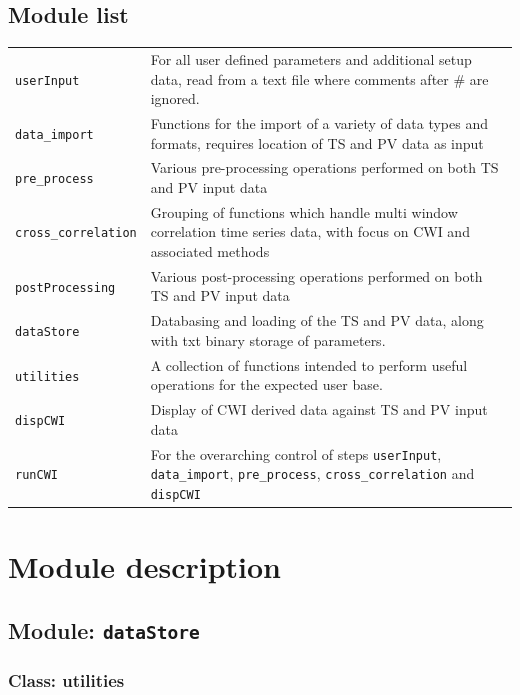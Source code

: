 \documentclass{article}
\begin{document}
\subsection{Module list}
\begin{tabular}{l|p{120mm}}
\texttt{userInput} & For all user defined parameters and additional setup data, read from a text file where comments after \# are ignored.  \\
\texttt{data\_import} & Functions for the import of a variety of data types and formats, requires location of TS and PV data as input  \\
\texttt{pre\_process} & Various pre-processing operations performed on both TS and PV input data \\
\texttt{cross\_correlation} & Grouping of functions which handle multi window correlation time series data, with focus on CWI and associated methods  \\
\texttt{postProcessing} & Various post-processing operations performed on both TS and PV input data \\
\texttt{dataStore} & Databasing and loading of the TS and PV data, along with txt binary storage of parameters.  \\
\texttt{utilities} & A collection of functions intended to perform useful operations for the expected user base.  \\
\texttt{dispCWI} & Display of CWI derived data against TS and PV input data  \\
\texttt{runCWI} & For the overarching control of steps \texttt{userInput}, \texttt{data\_import}, \texttt{pre\_process}, \texttt{cross\_correlation} and \texttt{dispCWI} \\

\end{tabular}

\section{Module description}
	\subsection{Module: \texttt{dataStore}}
		\subsubsection{Class: utilities}
\end{document}
